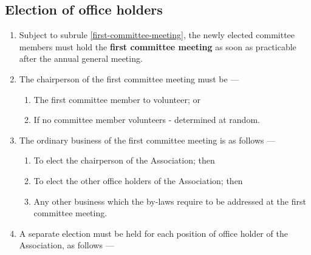 \documentclass[../constitution.tex]{subfiles}
\begin{document}
\hypertarget{election-of-office-holders}{%
  \subsection{Election of office holders}\label{election-of-office-holders}}

\begin{enumerate}

  \item Subject to subrule \ref{first-committee-meeting}, the newly elected committee members must hold the \textbf{first committee meeting} as soon as practicable after the annual general meeting.

  \item The chairperson of the first committee meeting must be ---

        \begin{enumerate}
          \item The first committee member to volunteer; or
          \item If no committee member volunteers - determined at random.
        \end{enumerate}

  \item The ordinary business of the first committee meeting is as follows ---

        \begin{enumerate}
          \item To elect the chairperson of the Association; then
          \item To elect the other office holders of the Association; then
          \item Any other business which the by-laws require to be addressed at the first committee meeting.
        \end{enumerate}




  \item A separate election must be held for each position of office holder of the Association, as follows ---


\end{enumerate}
\end{document}
